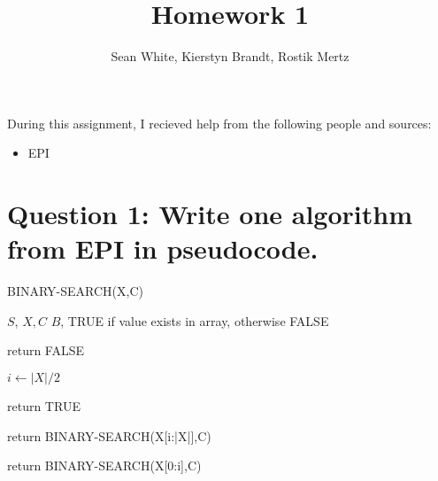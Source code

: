 \documentclass[11pt]{article}
\title{Homework 1}
\author{Sean White, Kierstyn Brandt, Rostik Mertz}
\begin{document}
\maketitle

\noindent
During this assignment, I recieved help from the following people and sources:
\begin{itemize}
 \item EPI
\end{itemize}


\section*{Question 1: Write one algorithm from EPI in pseudocode.}
  \begin{algorithm}\caption{\textsc{BINARY-SEARCH(X,C)}}\label{alg:bs}
 \begin{algorithmic}[1]
    $S$, $X,C$
    $B$, TRUE if value exists in array, otherwise FALSE
   \State ~

   \State return FALSE
   \EndIf
   
   \State $i \gets |X|/2$

   \State return TRUE
   \EndIf

   \State return BINARY-SEARCH(X[i:|X|],C)
   \EndIf

   \State return BINARY-SEARCH(X[0:i],C)
   \EndIf
 \end{algorithmic}
\end{algorithm}
\end{document}
